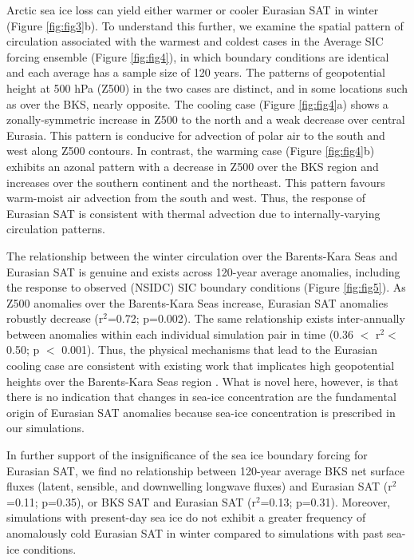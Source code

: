\documentclass{nature}
\begin{document}
Arctic sea ice loss can yield either warmer or cooler Eurasian SAT in winter (Figure \ref{fig:fig3}b). To understand this further, we examine the spatial pattern of circulation associated with the warmest and coldest cases in the Average SIC forcing ensemble (Figure \ref{fig:fig4}), in which boundary conditions are identical and each average has a sample size of 120 years. The patterns of geopotential height at 500 hPa (Z500) in the two cases are distinct, and in some locations such as over the BKS, nearly opposite. The cooling case (Figure \ref{fig:fig4}a) shows a zonally-symmetric increase in Z500 to the north and a weak decrease over central Eurasia. This pattern is conducive for advection of polar air to the south and west along Z500 contours. In contrast, the warming case (Figure \ref{fig:fig4}b) exhibits an azonal pattern with a decrease in Z500 over the BKS region and increases over the southern continent and the northeast. This pattern favours warm-moist air advection from the south and west. Thus, the response of Eurasian SAT is consistent with thermal advection due to internally-varying circulation patterns. 

The relationship between the winter circulation over the Barents-Kara Seas and Eurasian SAT is genuine and exists across 120-year average anomalies, including the response to observed (NSIDC) SIC boundary conditions (Figure \ref{fig:fig5}). As Z500 anomalies over the Barents-Kara Seas increase, Eurasian SAT anomalies robustly decrease (r$^2$=0.72; p=0.002). The same relationship exists inter-annually between anomalies within each individual simulation pair in time (0.36 $<$ r$^2<$ 0.50; p $<$ 0.001). Thus, the physical mechanisms that lead to the Eurasian cooling case are consistent with existing work that implicates high geopotential heights over the Barents-Kara Seas region \cite{honda09,petoukhov10,mori14}. What is novel here, however, is that there is no indication that changes in sea-ice concentration are the fundamental origin of Eurasian SAT anomalies because sea-ice concentration is prescribed in our simulations. 

In further support of the insignificance of the sea ice boundary forcing for Eurasian SAT, we find no relationship between 120-year average BKS net surface fluxes (latent, sensible, and downwelling longwave fluxes) and Eurasian SAT (r$^2$=0.11; p=0.35), or BKS SAT and Eurasian SAT (r$^2$=0.13; p=0.31). Moreover, simulations with present-day sea ice do not exhibit a greater frequency of anomalously cold Eurasian SAT in winter compared to simulations with past sea-ice conditions.
\end{document}
